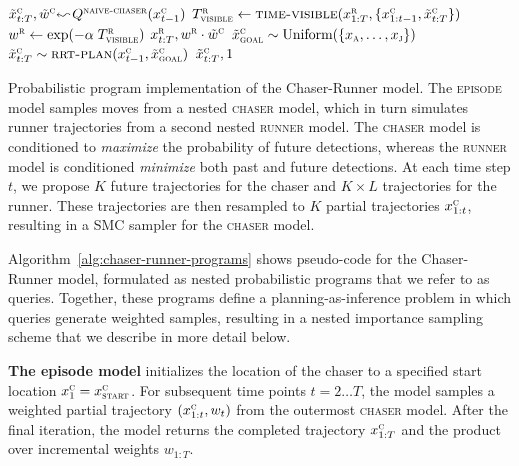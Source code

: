 \documentclass[twoside]{article}
\newcommand{\qry}{\ensuremath{$\reflectbox{$\,\leadsto$}$}}
\begin{document}
\begin{algorithm}[!t]
\begin{algorithmic}
    \State $\tilde{x}^\textsc{c}_{t:T}, \tilde{w}^\textsc{c} \qry Q^\textsc{naive-chaser}(x^\textsc{c}_{t-1})$
    \State $T^\textsc{r}_\textsc{visible} \gets \Call{time-visible}{x^\textsc{r}_{1:T}, \{x^\textsc{c}_{1:t-1}, \tilde{x}^\textsc{c}_{t:T}\}}$
    \State $w^\textsc{r} \gets \exp(-\alpha \; T^\textsc{r}_\textsc{visible})$
    \State \Return $x^\textsc{r}_{t:T},  w^\textsc{r} \cdot \tilde{w}^\textsc{c}$
\EndQuery
{} 
    \State $\tilde{x}^\textsc{c}_\textsc{goal} \sim \text{Uniform}(\{x_\textsc{a},\ldots,x_\textsc{j}\})$
    \State $\tilde{x}^\textsc{c}_{t:T} \sim \Call{rrt-plan}{x^\textsc{c}_{t-1}, \tilde{x}^\textsc{c}_\textsc{goal}}$ 
    \State \Return $\tilde{x}^\textsc{c}_{t:T}, 1$
\EndQuery
\end{algorithmic}

\caption{
\label{alg:chaser-runner-programs}
Probabilistic program implementation of the Chaser-Runner model. The \textsc{episode} model samples moves from a nested \textsc{chaser} model, which in turn simulates runner trajectories from a second nested \textsc{runner} model. The \textsc{chaser} model is conditioned to \emph{maximize} the probability of future detections, whereas the \textsc{runner} model is conditioned \emph{minimize} both past and future detections. At each time step $t$, we propose $K$ future trajectories for the chaser and $K \times L$ trajectories for the runner. These trajectories are then resampled to $K$ partial trajectories $x^\textsc{c}_{1:t}$, resulting in a SMC sampler for the \textsc{chaser} model.}
\end{algorithm}

Algorithm~\ref{alg:chaser-runner-programs} shows pseudo-code for the Chaser-Runner model, formulated as nested probabilistic programs that we refer to as queries. Together, these programs define a planning-as-inference problem \cite{toussaint06} in which queries generate weighted samples, resulting in a nested importance sampling  \cite{naesseth2015nested} scheme that we describe in more detail below.

\textbf{The episode model} initializes the location of the chaser to a specified start location $x^\textsc{c}_1 = x^\textsc{c}_\textsc{start}$. For subsequent time points $t=2 \ldots T$, the model samples a weighted partial trajectory $(x^\textsc{c}_{1:t}, w_t)$ from the outermost \textsc{chaser} model. After the final iteration, the model returns the completed trajectory $x^\textsc{c}_{1:T}$ and the product over incremental weights $w_{1:T}$.
\end{document}
